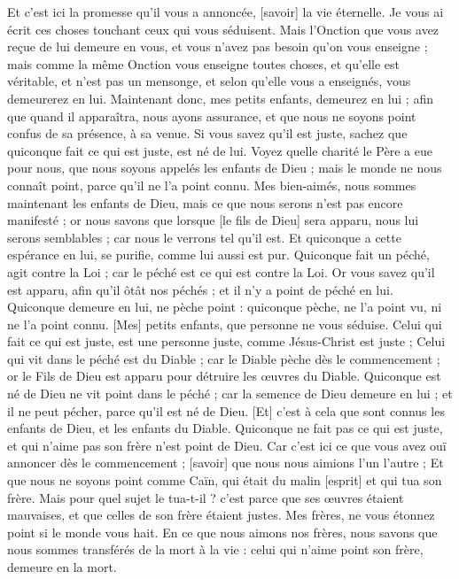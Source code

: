\begin{multicols}{2}
Et c'est ici la promesse qu'il vous a annoncée, [savoir] la vie éternelle.
Je vous ai écrit ces choses touchant ceux qui vous séduisent.
Mais l'Onction que vous avez reçue de lui demeure en vous, et vous n'avez pas besoin qu'on vous enseigne ; mais comme la même Onction vous enseigne toutes choses, et qu'elle est véritable, et n'est pas un mensonge, et selon qu'elle vous a enseignés, vous demeurerez en lui.
Maintenant donc, mes petits enfants, demeurez en lui ; afin que quand il apparaîtra, nous ayons assurance, et que nous ne soyons point confus de sa présence, à sa venue.
Si vous savez qu'il est juste, sachez que quiconque fait ce qui est juste, est né de lui.
\VerseOne{}Voyez quelle charité le Père a eue pour nous, que nous soyons appelés les enfants de Dieu ; mais le monde ne nous connaît point, parce qu'il ne l'a point connu.
Mes bien-aimés, nous sommes maintenant les enfants de Dieu, mais ce que nous serons n'est pas encore manifesté ; or nous savons que lorsque [le fils de Dieu] sera apparu, nous lui serons semblables ; car nous le verrons tel qu'il est.
Et quiconque a cette espérance en lui, se purifie, comme lui aussi est pur.
Quiconque fait un péché, agit contre la Loi ; car le péché est ce qui est contre la Loi.
Or vous savez qu'il est apparu, afin qu'il ôtât nos péchés ; et il n'y a point de péché en lui.
Quiconque demeure en lui, ne pèche point : quiconque pèche, ne l'a point vu, ni ne l'a point connu.
[Mes] petits enfants, que personne ne vous séduise. Celui qui fait ce qui est juste, est une personne juste, comme Jésus-Christ est juste ;
Celui qui vit dans le péché est du Diable ; car le Diable pèche dès le commencement ; or le Fils de Dieu est apparu pour détruire les œuvres du Diable.
Quiconque est né de Dieu ne vit point dans le péché ; car la semence de Dieu demeure en lui ; et il ne peut pécher, parce qu'il est né de Dieu.
[Et] c'est à cela que sont connus les enfants de Dieu, et les enfants du Diable. Quiconque ne fait pas ce qui est juste, et qui n'aime pas son frère n'est point de Dieu.
Car c'est ici ce que vous avez ouï annoncer dès le commencement ; [savoir] que nous nous aimions l'un l'autre ;
Et que nous ne soyons point comme Caïn, qui était du malin [esprit] et qui tua son frère. Mais pour quel sujet le tua-t-il ? c'est parce que ses œuvres étaient mauvaises, et que celles de son frère étaient justes.
Mes frères, ne vous étonnez point si le monde vous hait.
En ce que nous aimons nos frères, nous savons que nous sommes transférés de la mort à la vie : celui qui n'aime point son frère, demeure en la mort.

\end{multicols}
